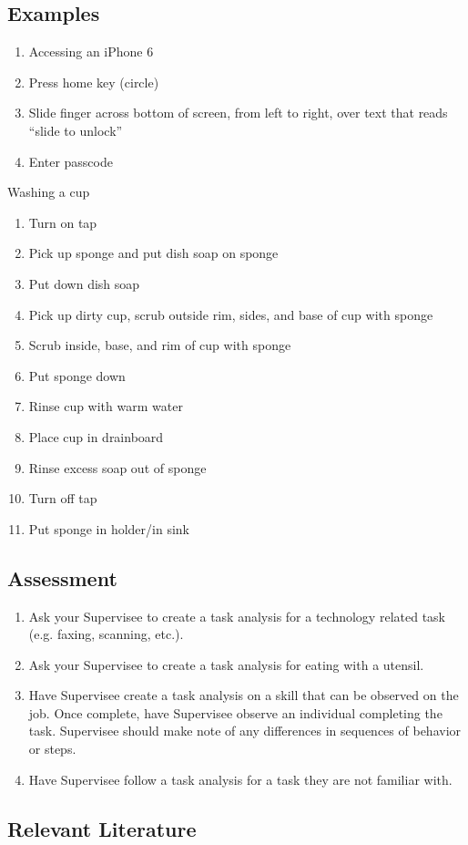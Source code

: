 \subsection{Examples}
\begin{enumerate}
\item Accessing an iPhone 6
\item Press home key (circle) 
\item Slide finger across bottom of screen, from left to right, over text that reads ``slide to unlock''
\item Enter passcode
\end{enumerate}
%
Washing a cup
\begin{enumerate}
\item Turn on tap
\item Pick up sponge and put dish soap on sponge
\item Put down dish soap
\item Pick up dirty cup, scrub outside rim, sides, and base of cup with sponge
\item Scrub inside, base, and rim of cup with sponge
\item Put sponge down
\item Rinse cup with warm water
\item Place cup in drainboard 
\item Rinse excess soap out of sponge
\item Turn off tap
\item Put sponge in holder/in sink
\end{enumerate}
%
\subsection{Assessment}
\begin{enumerate}
\item Ask your Supervisee to create a task analysis for a technology related task (e.g. faxing, scanning, etc.).
\item Ask your Supervisee to create a task analysis for eating with a utensil. 
\item Have Supervisee create a task analysis on a skill that can be observed on the job. Once complete, have Supervisee observe an individual completing the task. Supervisee should make note of any differences in sequences of behavior or steps.
\item Have Supervisee follow a task analysis for a task they are not familiar with.
\end{enumerate}
%
\subsection{Relevant Literature}
\begin{refsection}
\nocite{cooper2007applied,
    resnick1973task,
    bancroft2011comparison,
    jerome2007effects,
    slocum2011assessment}
\printbibliography[heading=none]
\end{refsection}
%
